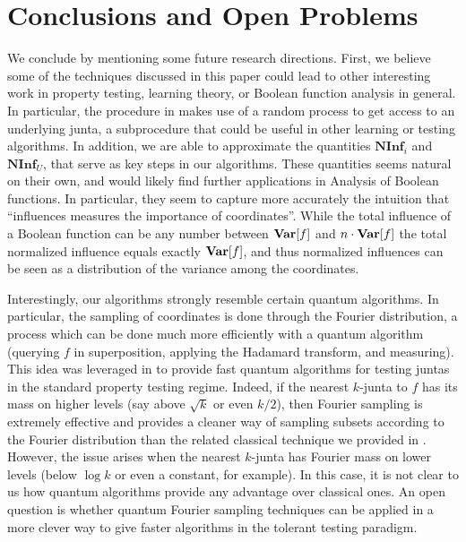 \documentclass[10pt,a4paper]{article}
\theoremstyle{plain}
\theoremstyle{remark}
\theoremstyle{plain}
\def\var{{\mathop{\bf Var\/}}}
\newcommand\NormInf{{\mathbf{NInf}}}
\begin{document}
\section{Conclusions and Open Problems}
\label{section:conclusion}


We conclude by mentioning some future research directions. First, we believe some of the techniques discussed in this paper could lead to other interesting work in property testing, learning theory, or Boolean function analysis in general. 
In particular, the procedure in  makes use of a random process to get access to an underlying junta, a subprocedure that could be useful in other learning or testing algorithms. 
In addition, we are able to approximate the quantities $\NormInf_i$ and $\NormInf_U$, that serve as key steps in our algorithms. These quantities seems natural on their own, and would likely find further applications in Analysis of Boolean functions. In particular, they seem to capture more accurately the intuition that ``influences measures the importance of coordinates''.
While the total influence of a Boolean function can be any number between $\var[f]$ and $n\cdot \var[f]$ the total normalized influence equals exactly $\var[f]$, and thus normalized influences can be seen as a distribution of the variance among the coordinates. 

Interestingly, our algorithms strongly resemble certain quantum algorithms. In particular, the sampling of coordinates is done through the Fourier distribution, a process which can be done much more efficiently with a quantum algorithm (querying $f$ in superposition, applying the Hadamard transform, and measuring). 
This idea was leveraged in \cite{quantum-junta-testing} to provide fast quantum algorithms for testing juntas in the standard property testing regime. 
Indeed, if the nearest $k$-junta to $f$ has its mass on higher levels (say above $\sqrt{k}$ or even $k/2$), then Fourier sampling is extremely effective and provides a cleaner way of sampling subsets according to the Fourier distribution than the related classical technique we provided in . However, the issue arises when the nearest $k$-junta has Fourier mass on lower levels (below $\log k$ or even a constant, for example). In this case, it is not clear to us how quantum algorithms provide any advantage over classical ones. 
An open question is whether quantum Fourier sampling techniques can be applied in a more clever way to give faster algorithms in the tolerant testing paradigm.
\end{document}
